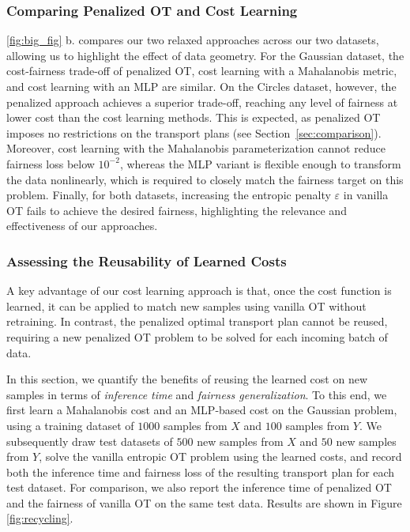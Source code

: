 \documentclass{article}
\theoremstyle{definition}
\begin{document}
\subsubsection{Comparing Penalized OT and Cost Learning}\label{ssec:simulated_data}
\cref{fig:big_fig} b. compares our two relaxed approaches across our two datasets, allowing us to highlight the effect of data geometry. 
For the Gaussian dataset, the cost-fairness trade-off of penalized OT, cost learning with a Mahalanobis metric, and cost learning with an MLP are similar. On the Circles dataset, however, the penalized approach achieves a superior trade-off, reaching any level of fairness at lower cost than the cost learning methods. This is expected, as penalized OT imposes no restrictions on the transport plans (see Section~\ref{sec:comparison}). Moreover, cost learning with the Mahalanobis parameterization cannot reduce fairness loss below $10^{-2}$, whereas the MLP variant is flexible enough to transform the data nonlinearly, which is required to closely match the fairness target on this problem. Finally, for both datasets, increasing the entropic penalty $\varepsilon$ in vanilla OT fails to achieve the desired fairness, highlighting the relevance and effectiveness of our approaches.
\subsubsection{Assessing the Reusability of Learned Costs}
A key advantage of our cost learning approach is that, once the cost function is learned, it can be applied to match new samples using vanilla OT without retraining. In contrast, the penalized optimal transport plan cannot be reused, requiring a new penalized OT problem to be solved for each incoming batch of data. 

In this section, we quantify the benefits of reusing the learned cost on new samples in terms of \emph{inference time} and \emph{fairness generalization}.
To this end, we first learn a Mahalanobis cost and an MLP-based cost on the Gaussian problem, using a training dataset of $1000$ samples from $X$ and $100$ samples from $Y$. We subsequently draw test datasets of $500$ new samples from $X$ and $50$ new samples from $Y$, solve the vanilla entropic OT problem using the learned costs, and record both the inference time and fairness loss of the resulting transport plan for each test dataset. For comparison, we also report the inference time of penalized OT and the fairness of vanilla OT on the same test data. Results are shown in Figure \ref{fig:recycling}.
\end{document}
